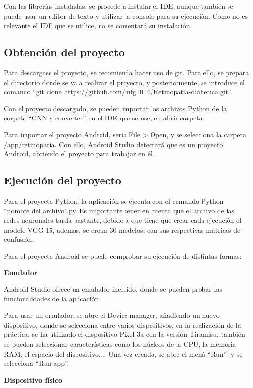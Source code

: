 Con las librerías instaladas, se procede a instalar el IDE, aunque también se puede usar un editor de texto y utilizar la consola para su ejecución. Como no es relevante el IDE que se utilice, no se comentará su instalación.

\subsection{Obtención del proyecto}

Para descargase el proyecto, se recomienda hacer uso de git. Para ello, se prepara el directorio donde se va a realizar el  proyecto, y posteriormente, se introduce el comando ``git clone https://github.com/mfg1014/Retinopatia-diabetica.git''.

Con el proyecto descargado, se pueden importar los archivos Python de la carpeta ``CNN y converter'' en el IDE que se use, en abrir carpeta. 

Para importar el proyecto Android, sería File > Open, y se selecciona la carpeta /app/retinopatía. Con ello, Android Studio detectará que es un proyecto Android, abriendo el proyecto para trabajar en él.

\subsection{Ejecución del proyecto}

Para el proyecto Python, la aplicación se ejecuta con el comando Python ``nombre del archivo''.py. Es importante tener en cuenta que el archivo de las redes neuronales tarda bastante, debido a que tiene que crear cada ejecución el modelo VGG-16, además, se crean 30 modelos, con sus respectivas matrices de confusión.

Para el proyecto Android se puede comprobar su ejecución de distintas formas:

\textbf{Emulador}

Android Studio ofrece un emulador incluido, donde se pueden probar las funcionalidades de la aplicación.

Para usar un emulador, se abre el Device manager, añadiendo un nuevo dispositivo, donde se selecciona entre varios dispositivos, en la realización de la práctica, se ha utilizado el dispositivo Pixel 3a con la versión Tiramisu, también se pueden seleccionar características como los núcleos de la CPU, la memoria RAM, el espacio del dispositivo,... Una vez creado, se abre el menú ``Run'', y se selecciona ``Run app''.

\textbf{Dispositivo físico}

